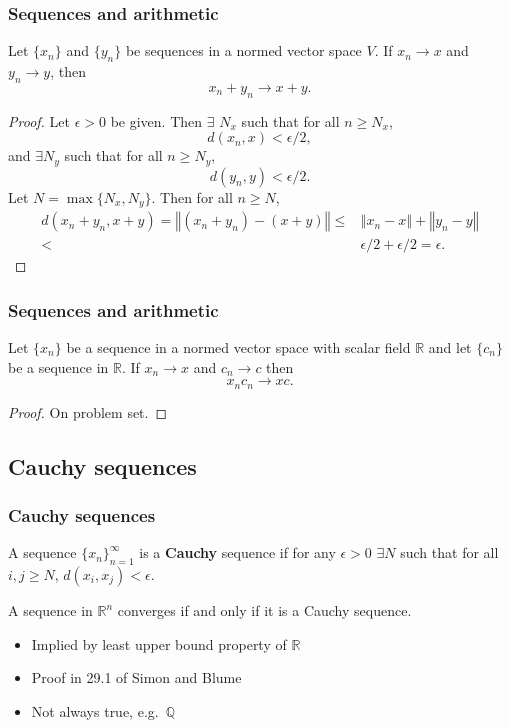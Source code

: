 \documentclass[compress]{beamer}
\def\R{\mathbb{R}}
\newcommand{\norm}[1]{\left\Vert {#1} \right\Vert}
\newcommand{\seq}[1]{\{{#1}_n \}_{n=1}^\infty }
\renewcommand{\to}{{\rightarrow}}
\begin{document}
\begin{frame}
  \frametitle{Sequences and arithmetic}
  \begin{theorem}
    Let $\{x_n\}$ and $\{y_n\}$ be sequences in a normed vector space
    $V$. If $x_n \to x$ and $y_n \to y$, then
    \[ x_n + y_n \to x + y. \]
  \end{theorem}
  \begin{proof}
    Let $\epsilon > 0$ be given. Then $\exists$ $N_x$ such that for all
    $n \geq N_x$, 
    \[ d(x_n,x) < \epsilon/2,\] and $\exists N_y$ such that
    for all $n \geq N_y$,  
    \[ d(y_n,y) < \epsilon/2. \]
    Let $N =\max\{N_x,N_y\}$. Then for all $n \geq N$, 
    \begin{align*}
      d(x_n + y_n,x+y) = \norm{(x_n + y_n) - (x+y)} \leq & \norm{x_n -
        x} + \norm{y_n - y} \\
      < & \epsilon/2 + \epsilon /2  = \epsilon.
    \end{align*}  
  \end{proof}
\end{frame}

\begin{frame}
  \frametitle{Sequences and arithmetic}
  \begin{theorem}
    Let $\{x_n \}$ be a sequence in a normed vector space with scalar
    field $\R$ and let $\{c_n\}$ be a sequence in $\R$. If
    $x_n \to x$ and $c_n \to c$ then 
    \[ x_n c_n \to x c. \]
  \end{theorem}
  \begin{proof}
    On problem set. 
  \end{proof}
\end{frame}

\subsection*{Cauchy sequences}

\begin{frame}
  \frametitle{Cauchy sequences}
  \begin{definition}
    A sequence $\seq{x}$ is a \textbf{Cauchy} sequence if for any
    $\epsilon > 0$ $\exists N$ such that for all $i,j\geq N$,
    $d(x_i,x_j) < \epsilon$.
  \end{definition}
  \begin{theorem}
    A sequence in $\R^n$ converges if and only if it is a Cauchy
    sequence. 
  \end{theorem}
  \begin{itemize}
  \item Implied by least upper bound property of $\R$
  \item Proof in 29.1 of Simon and Blume
  \item Not always true, e.g.\ $\mathbb{Q}$
  \end{itemize}
\end{frame}
\end{document}
